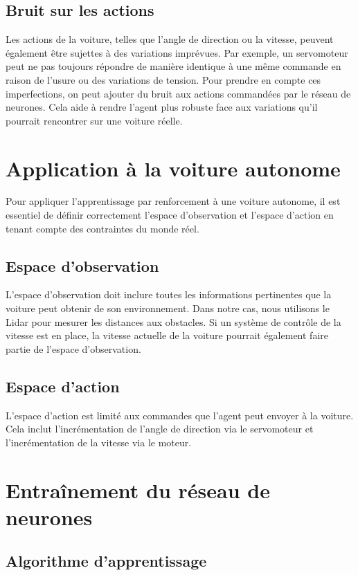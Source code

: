 \documentclass[french]{article}
\begin{document}
\subsection{Bruit sur les actions}
Les actions de la voiture, telles que l'angle de direction ou la vitesse, peuvent également être sujettes à des 
variations imprévues. Par exemple, un servomoteur peut ne pas toujours répondre de manière identique à une même 
commande en raison de l'usure ou des variations de tension. Pour prendre en compte ces imperfections, on peut 
ajouter du bruit aux actions commandées par le réseau de neurones. Cela aide à rendre l'agent plus robuste face 
aux variations qu'il pourrait rencontrer sur une voiture réelle.



\section{Application à la voiture autonome}
Pour appliquer l'apprentissage par renforcement à une voiture autonome, il est essentiel de définir correctement 
l'espace d'observation et l'espace d'action en tenant compte des contraintes du monde réel.

\subsection{Espace d'observation}
L'espace d'observation doit inclure toutes les informations pertinentes que la voiture peut obtenir de son environnement.
Dans notre cas, nous utilisons le Lidar pour mesurer les distances aux obstacles. Si un système de contrôle de 
la vitesse est en place, la vitesse actuelle de la voiture pourrait également faire partie de l'espace d'observation.

\subsection{Espace d'action}
L'espace d'action est limité aux commandes que l'agent peut envoyer à la voiture. Cela inclut l'incrémentation de 
l'angle de direction via le servomoteur et l'incrémentation de la vitesse via le moteur.


\section{Entraînement du réseau de neurones}
\subsection{Algorithme d'apprentissage}
\end{document}
